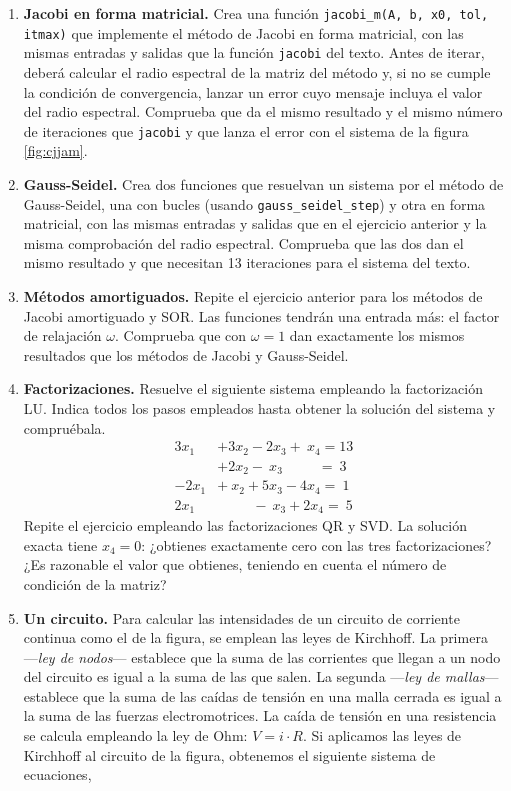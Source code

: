 \begin{enumerate}
\item \label{ej:jacobi} \textbf{Jacobi en forma matricial.} Crea una función \texttt{jacobi\_m(A, b, x0, tol, itmax)} que implemente el método de Jacobi en forma matricial, con las mismas entradas y salidas que la función \texttt{jacobi} del texto. Antes de iterar, deberá calcular el radio espectral de la matriz del método y, si no se cumple la condición de convergencia, lanzar un error cuyo mensaje incluya el valor del radio espectral. Comprueba que da el mismo resultado y el mismo número de iteraciones que \texttt{jacobi} y que lanza el error con el sistema de la figura \ref{fig:cjjam}.

\item \label{ej:gs} \textbf{Gauss-Seidel.} Crea dos funciones que resuelvan un sistema por el método de Gauss-Seidel, una con bucles (usando \texttt{gauss\_seidel\_step}) y otra en forma matricial, con las mismas entradas y salidas que en el ejercicio anterior y la misma comprobación del radio espectral. Comprueba que las dos dan el mismo resultado y que necesitan 13 iteraciones para el sistema del texto.

\item \label{ej:amortiguados} \textbf{Métodos amortiguados.} Repite el ejercicio anterior para los métodos de Jacobi amortiguado y SOR. Las funciones tendrán una entrada más: el factor de relajación $\omega$. Comprueba que con $\omega=1$ dan exactamente los mismos resultados que los métodos de Jacobi y Gauss-Seidel.

\item \textbf{Factorizaciones.} Resuelve el siguiente sistema empleando la factorización LU. Indica todos los pasos empleados hasta obtener la solución del sistema y compruébala.
\begin{align*}
3x_1&+3x_2-2x_3 +\ x_4= 13\\
 &+2x_2-\ x_3  \hspace{30pt} =\ 3\\
-2x_1&+\ x_2 + 5x_3 -4x_4=\ 1\\
2x_1& \hspace{30pt} -\ x_3 +2x_4 =\ 5
\end{align*}
Repite el ejercicio empleando las factorizaciones QR y SVD. La solución exacta tiene $x_4=0$: ¿obtienes exactamente cero con las tres factorizaciones? ¿Es razonable el valor que obtienes, teniendo en cuenta el número de condición de la matriz?

\item \label{ej:circuito} \textbf{Un circuito.} Para calcular las intensidades de un circuito de corriente continua como el de la figura, se emplean las leyes de Kirchhoff. La primera ---\emph{ley de nodos}--- establece que la suma de las corrientes que llegan a un nodo del circuito es igual a la suma de las que salen. La segunda ---\emph{ley de mallas}--- establece que la suma de las caídas de tensión en una malla cerrada es igual a la suma de las fuerzas electromotrices. La caída de tensión en una resistencia se calcula empleando la ley de Ohm: $V = i\cdot R$.
Si aplicamos las leyes de Kirchhoff al circuito de la figura, obtenemos el siguiente sistema de ecuaciones,


\end{enumerate}

